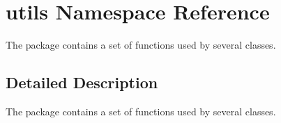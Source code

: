 \hypertarget{namespaceutils}{}\section{utils Namespace Reference}
\label{namespaceutils}


The package contains a set of functions used by several classes.  




\subsection{Detailed Description}
The package contains a set of functions used by several classes. 


